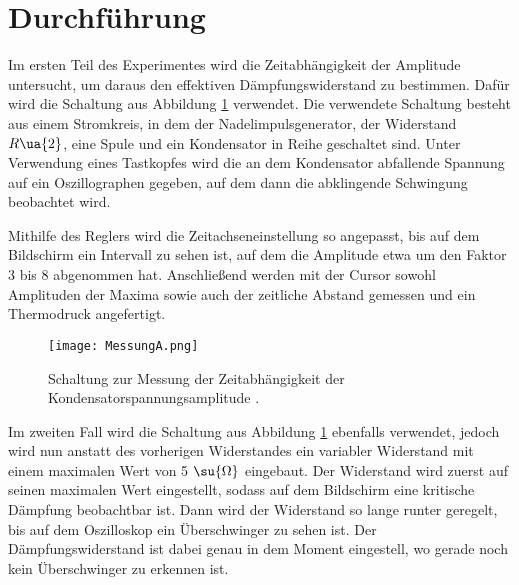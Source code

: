 \newpage

\section{Durchführung}

Im ersten Teil des Experimentes wird die Zeitabhängigkeit der Amplitude untersucht,
um daraus den effektiven Dämpfungswiderstand zu bestimmen. Dafür wird die Schaltung
aus Abbildung \ref{fig:MessungA} verwendet. Die verwendete Schaltung besteht aus
einem Stromkreis, in dem der Nadelimpulsgenerator, der Widerstand $R\ua{2}$, eine
Spule und ein Kondensator in Reihe geschaltet sind. Unter Verwendung eines Tastkopfes wird die an
dem Kondensator abfallende Spannung auf ein Oszillographen gegeben, auf dem dann
die abklingende Schwingung beobachtet wird.

Mithilfe des Reglers wird die Zeitachseneinstellung so angepasst, bis
auf dem Bildschirm ein Intervall zu sehen ist, auf dem die Amplitude etwa um
den Faktor 3 bis 8 abgenommen hat. Anschließend werden mit der Cursor sowohl
Amplituden der Maxima sowie auch der zeitliche Abstand gemessen und ein Thermodruck
angefertigt.

\FloatBarrier
\begin{figure}
  \centering
  \texttt{[image: MessungA.png]}
  \caption{Schaltung zur Messung der Zeitabhängigkeit der Kondensatorspannungsamplitude \cite{anleitung01}.}
  \label{fig:MessungA}
\end{figure}
\FloatBarrier


Im zweiten Fall wird die Schaltung aus Abbildung \ref{fig:MessungA} ebenfalls
verwendet, jedoch wird nun anstatt des vorherigen Widerstandes ein variabler
Widerstand mit einem maximalen Wert von 5 $\su{\Omega}$ eingebaut. Der Widerstand wird
zuerst auf seinen maximalen Wert eingestellt, sodass auf dem Bildschirm eine
kritische Dämpfung beobachtbar ist. Dann wird der Widerstand so lange runter geregelt, bis
auf dem Oszilloskop ein Überschwinger zu sehen ist. Der Dämpfungswiderstand ist
dabei genau in dem Moment eingestell, wo gerade noch kein Überschwinger zu erkennen
ist.

\newpage

